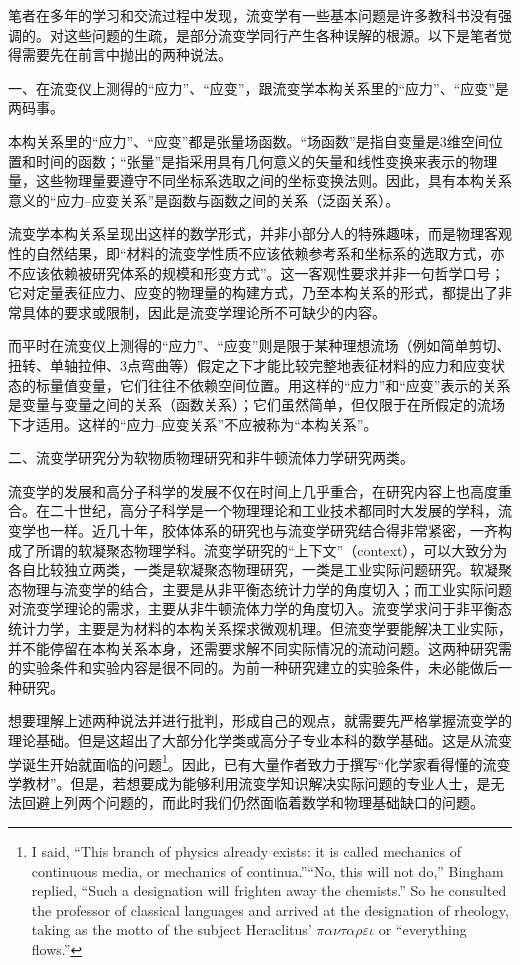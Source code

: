\documentclass[main.tex]{subfiles}
\begin{document}
笔者在多年的学习和交流过程中发现，流变学有一些基本问题是许多教科书没有强调的。对这些问题的生疏，是部分流变学同行产生各种误解的根源。以下是笔者觉得需要先在前言中抛出的两种说法。

一、在流变仪上测得的“应力”、“应变”，跟流变学本构关系里的“应力”、“应变”是两码事。

本构关系里的“应力”、“应变”都是张量场函数。“场函数”是指自变量是3维空间位置和时间的函数；“张量”是指采用具有几何意义的矢量和线性变换来表示的物理量，这些物理量要遵守不同坐标系选取之间的坐标变换法则。因此，具有本构关系意义的“应力--应变关系”是函数与函数之间的关系（泛函关系）。

流变学本构关系呈现出这样的数学形式，并非小部分人的特殊趣味，而是物理客观性的自然结果，即“材料的流变学性质不应该依赖参考系和坐标系的选取方式，亦不应该依赖被研究体系的规模和形变方式”。这一客观性要求并非一句哲学口号；它对定量表征应力、应变的物理量的构建方式，乃至本构关系的形式，都提出了非常具体的要求或限制，因此是流变学理论所不可缺少的内容。

而平时在流变仪上测得的“应力”、“应变”则是限于某种理想流场（例如简单剪切、扭转、单轴拉伸、3点弯曲等）假定之下才能比较完整地表征材料的应力和应变状态的标量值变量，它们往往不依赖空间位置。用这样的“应力”和“应变”表示的关系是变量与变量之间的关系（函数关系）；它们虽然简单，但仅限于在所假定的流场下才适用。这样的“应力--应变关系”不应被称为“本构关系”。

二、流变学研究分为软物质物理研究和非牛顿流体力学研究两类。

流变学的发展和高分子科学的发展不仅在时间上几乎重合，在研究内容上也高度重合。在二十世纪，高分子科学是一个物理理论和工业技术都同时大发展的学科，流变学也一样。近几十年，胶体体系的研究也与流变学研究结合得非常紧密，一齐构成了所谓的软凝聚态物理学科。流变学研究的“上下文”（context），可以大致分为各自比较独立两类，一类是软凝聚态物理研究，一类是工业实际问题研究。软凝聚态物理与流变学的结合，主要是从非平衡态统计力学的角度切入；而工业实际问题对流变学理论的需求，主要从非牛顿流体力学的角度切入。流变学求问于非平衡态统计力学，主要是为材料的本构关系探求微观机理。但流变学要能解决工业实际，并不能停留在本构关系本身，还需要求解不同实际情况的流动问题。这两种研究需的实验条件和实验内容是很不同的。为前一种研究建立的实验条件，未必能做后一种研究。

想要理解上述两种说法并进行批判，形成自己的观点，就需要先严格掌握流变学的理论基础。但是这超出了大部分化学类或高分子专业本科的数学基础。这是从流变学诞生开始就面临的问题\footnote{
      I said, ``This branch of physics already exists: it is called mechanics of continuous media, or mechanics of continua.''``No, this will not do,'' Bingham replied, ``Such a designation will frighten away the chemists.'' So he consulted the professor of classical languages and arrived at the designation of rheology, taking as the motto of the subject Heraclitus' $\pi\alpha\nu\tau\alpha \rho\varepsilon\iota$ or ``everything flows.''\cite{Reiner1964}
}。因此，已有大量作者致力于撰写“化学家看得懂的流变学教材”。但是，若想要成为能够利用流变学知识解决实际问题的专业人士，是无法回避上列两个问题的，而此时我们仍然面临着数学和物理基础缺口的问题。
\end{document}
